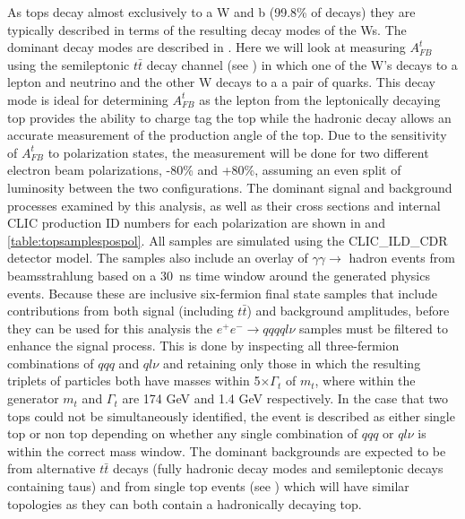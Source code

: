 As tops decay almost exclusively to a W and b (99.8\% of decays) they are typically described in terms of the resulting decay modes of the Ws. The dominant decay modes are described in . Here we will look at measuring $A_{FB}^{t}$ using the semileptonic $t\bar{t}$ decay channel (see ) in which one of the W's decays to a lepton and neutrino and the other W decays to a a pair of quarks. This decay mode is ideal for determining $A_{FB}^{t}$ as the lepton from the leptonically decaying top provides the ability to charge tag the top while the hadronic decay allows an accurate measurement of the production angle of the top. Due to the sensitivity of $A_{FB}^{t}$ to polarization states, the measurement will be done for two different electron beam polarizations, -80\% and +80\%, assuming an even split of luminosity between the two configurations. The dominant signal and background processes examined by this analysis, as well as their cross sections and internal \ac{CLIC} production ID numbers for each polarization are shown in  and \ref{table:topsamplespospol}. All samples are simulated using the CLIC\_ILD\_CDR detector model. The samples also include an overlay of $\gamma\gamma\rightarrow$ hadron events from beamsstrahlung based on a 30~ns time window around the generated physics events. Because these are inclusive six-fermion final state samples that include contributions from both signal (including $t\bar{t}$) and background amplitudes, before they can be used for this analysis the $e^+e^-\rightarrow qqqql\nu$ samples must be filtered to enhance the signal process. This is done by inspecting all three-fermion combinations of $qqq$ and $ql\nu$ and retaining only those in which the resulting triplets of particles both have masses within 5$\times\Gamma_t$ of $m_t$, where within the generator $m_t$ and $\Gamma_t$ are 174 GeV and 1.4 GeV respectively. In the case that two tops could not be simultaneously identified, the event is described as either single top or non top depending on whether any single combination of $qqq$ or $ql\nu$ is within the correct mass window. The dominant backgrounds are expected to be from alternative $t\bar{t}$ decays (fully hadronic decay modes and semileptonic decays containing taus) and from single top events (see ) which will have similar topologies as they can both contain a hadronically decaying top.

